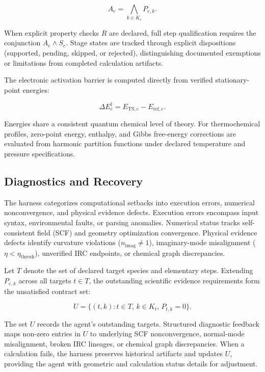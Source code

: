 \begin{equation}\label{eq:methods-13}
A_e=\bigwedge_{k\in K_e}P_{e,k}.
\end{equation}

When explicit property checks $R$ are declared, full step qualification requires the conjunction $A_e\wedge S_e$. Stage states are tracked through explicit dispositions (supported, pending, skipped, or rejected), distinguishing documented exemptions or limitations from completed calculation artifacts.

The electronic activation barrier is computed directly from verified stationary-point energies:

\begin{equation}\label{eq:methods-14}
\Delta E_e^\ddagger=E_{\mathrm{TS},e}-E_{\mathrm{ref},e}.
\end{equation}

Energies share a consistent quantum chemical level of theory. For thermochemical profiles, zero-point energy, enthalpy, and Gibbs free-energy corrections are evaluated from harmonic partition functions under declared temperature and pressure specifications.

\subsection{Diagnostics and Recovery}
The harness categorizes computational setbacks into execution errors, numerical nonconvergence, and physical evidence defects. Execution errors encompass input syntax, environmental faults, or parsing anomalies. Numerical status tracks self-consistent field (SCF) and geometry optimization convergence. Physical evidence defects identify curvature violations ($n_{\mathrm{imag}}\ne 1$), imaginary-mode misalignment ($\eta<\eta_{\mathrm{thresh}}$), unverified IRC endpoints, or chemical graph discrepancies.

Let $T$ denote the set of declared target species and elementary steps. Extending $P_{e,k}$ across all targets $t\in T$, the outstanding scientific evidence requirements form the unsatisfied contract set:

\begin{equation}\label{eq:methods-15}
U=\{(t,k):t\in T,\, k\in K_t,\, P_{t,k}=0\}.
\end{equation}

The set $U$ records the agent's outstanding targets. Structured diagnostic feedback maps non-zero entries in $U$ to underlying SCF nonconvergence, normal-mode misalignment, broken IRC lineages, or chemical graph discrepancies. When a calculation fails, the harness preserves historical artifacts and updates $U$, providing the agent with geometric and calculation status details for adjustment.

